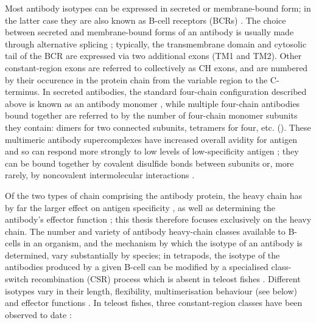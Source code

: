 Most antibody isotypes can be expressed in secreted or membrane-bound form; in the latter case they are also known as B-cell receptors (BCRs) \parencite{bengten2015fishantibodies}. The choice between secreted and membrane-bound forms of an antibody is usually made through alternative splicing \parencite{bengten2015fishantibodies,mashoof2016immunoglobulins}; typically, the transmembrane domain and cytosolic tail of the BCR are expressed via two additional exons (TM1 and TM2). Other constant-region exons are referred to collectively as CH exons, and are numbered by their occurence in the protein chain from the variable region to the C-terminus. In secreted antibodies, the standard four-chain configuration described above is known as an antibody monomer \parencite{mix2006immunoglobulins}, while multiple four-chain antibodies bound together are referred to by the number of four-chain monomer subunits they contain: dimers for two connected subunits, tetramers for four, etc. \parencite{mix2006immunoglobulins,schroeder2010immunoglobulins} (). These multimeric antibody supercomplexes have increased overall avidity for antigen and so can respond more strongly to low levels of low-specificity antigen \parencite{mix2006immunoglobulins}; they can be bound together by covalent disulfide bonds between subunits \parencite{schroeder2010immunoglobulins} or, more rarely, by noncovalent intermolecular interactions \parencite{zhang2010igtgut}.

Of the two types of chain comprising the antibody protein, the heavy chain has by far the larger effect on antigen specificity \parencite{shirai1999h3}, as well as determining the antibody's effector function  \parencite{schroeder2010immunoglobulins}; this thesis therefore focuses exclusively on the heavy chain. The number and variety of antibody heavy-chain classes available to B-cells in an organism, and the mechanism by which the isotype of an antibody is determined, vary substantially by species; in tetrapods, the isotype of the antibodies produced by a given B-cell can be modified by a specialised class-switch recombination (CSR) process which is absent in teleost fishes \parencite{senger2015switching}. Different isotypes vary in their length, flexibility, multimerisation behaviour (see below) and effector functions \parencite{schroeder2010immunoglobulins,senger2015switching}. In teleost fishes, three constant-region classes have been observed to date \parencite{bengten2015fishantibodies,mashoof2016immunoglobulins,fillatreau2013astonishing}:

